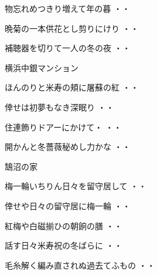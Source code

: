 \begin{shiika}物忘れめつきり増えて年の暮
\hfill{・・}\end{shiika}
\begin{shiika}晩菊の一本供花とし剪りにけり
\hfill{・・}\end{shiika}
\begin{shiika}補聴器を切りて一人の冬の夜
\hfill{・・}\end{shiika}
\vspace{0.6cm}
横浜中銀マンション
\begin{shiika}ほんのりと米寿の頬に屠蘇の紅
\hfill{・・}\end{shiika}
\begin{shiika}倖せは初夢もなき深眠り
\hfill{・・}\end{shiika}
\begin{shiika}住連飾りドアーにかけて・
\hfill{・・}\end{shiika}
\begin{shiika}開かんと冬薔薇秘めし力かな
\hfill{・・}\end{shiika}
\vspace{0.6cm}
鵠沼の家
\begin{shiika}梅一輪いちりん日々を留守居して
\hfill{・・}\end{shiika}
\vspace{0.6cm}
\begin{shiika}倖せや日々の留守居に梅一輪
\hfill{・・}\end{shiika}
\vspace{0.6cm}
\begin{shiika}紅梅や白磁揃ひの朝餉の膳
\hfill{・・}\end{shiika}
\vspace{0.6cm}
\begin{shiika}話す日々米寿祝の冬ばらに
\hfill{・・}\end{shiika}
\vspace{0.6cm}
\begin{shiika}毛糸解く編み直されぬ過去てふもの
\hfill{・・}\end{shiika}
\vspace{0.6cm}
